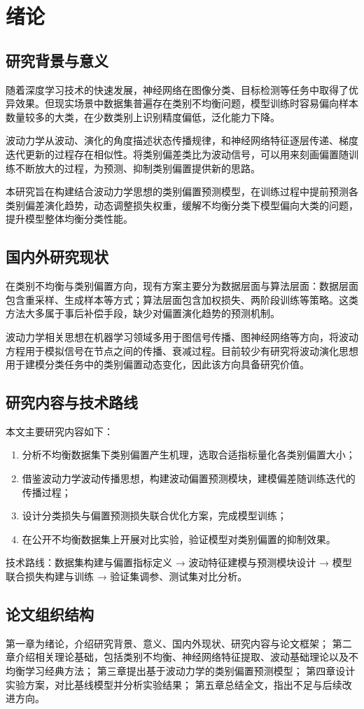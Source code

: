 \section{绪论}
\subsection{研究背景与意义}
随着深度学习技术的快速发展，神经网络在图像分类、目标检测等任务中取得了优异效果。但现实场景中数据集普遍存在类别不均衡问题，模型训练时容易偏向样本数量较多的大类，在少数类别上识别精度偏低，泛化能力下降。

波动力学从波动、演化的角度描述状态传播规律，和神经网络特征逐层传递、梯度迭代更新的过程存在相似性。将类别偏差类比为波动信号，可以用来刻画偏置随训练不断放大的过程，为预测、抑制类别偏置提供新的思路。

本研究旨在构建结合波动力学思想的类别偏置预测模型，在训练过程中提前预测各类别偏差演化趋势，动态调整损失权重，缓解不均衡分类下模型偏向大类的问题，提升模型整体均衡分类性能。

\subsection{国内外研究现状}
在类别不均衡与类别偏置方向，现有方案主要分为数据层面与算法层面：数据层面包含重采样、生成样本等方式；算法层面包含加权损失、两阶段训练等策略。这类方法大多属于事后补偿手段，缺少对偏置演化趋势的预测机制。

波动力学相关思想在机器学习领域多用于图信号传播、图神经网络等方向，将波动方程用于模拟信号在节点之间的传播、衰减过程。目前较少有研究将波动演化思想用于建模分类任务中的类别偏置动态变化，因此该方向具备研究价值。

\subsection{研究内容与技术路线}
本文主要研究内容如下：
\begin{enumerate}
    \item 分析不均衡数据集下类别偏置产生机理，选取合适指标量化各类别偏置大小；
    \item 借鉴波动力学波动传播思想，构建波动偏置预测模块，建模偏差随训练迭代的传播过程；
    \item 设计分类损失与偏置预测损失联合优化方案，完成模型训练；
    \item 在公开不均衡数据集上开展对比实验，验证模型对类别偏置的抑制效果。
\end{enumerate}

技术路线：数据集构建与偏置指标定义 → 波动特征建模与预测模块设计 → 模型联合损失构建与训练 → 验证集调参、测试集对比分析。

\subsection{论文组织结构}
第一章为绪论，介绍研究背景、意义、国内外现状、研究内容与论文框架；
第二章介绍相关理论基础，包括类别不均衡、神经网络特征提取、波动基础理论以及不均衡学习经典方法；
第三章提出基于波动力学的类别偏置预测模型；
第四章设计实验方案，对比基线模型并分析实验结果；
第五章总结全文，指出不足与后续改进方向。

